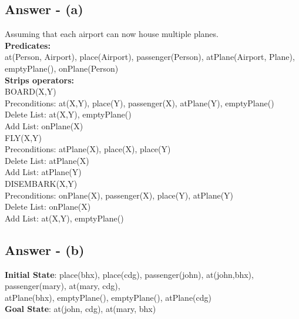 \documentclass{article}
\begin{document}
\subsection{Answer - (a)}
Assuming that each airport can now house multiple planes. \\
\newline
\textbf{Predicates: }\\
\newline
at(Person, Airport), place(Airport), passenger(Person),
atPlane(Airport, Plane), emptyPlane(), onPlane(Person) \\
\newline
\textbf{Strips operators: }\\
\newline
BOARD(X,Y) \\
\-\hspace{10mm} Preconditions: at(X,Y), place(Y), passenger(X), atPlane(Y), emptyPlane() \\
\-\hspace{10mm} Delete List: at(X,Y), emptyPlane() \\
\-\hspace{10mm} Add List: onPlane(X) \\
\newline
FLY(X,Y) \\
\-\hspace{10mm} Preconditions: atPlane(X), place(X), place(Y)\\
\-\hspace{10mm} Delete List: atPlane(X) \\
\-\hspace{10mm} Add List: atPlane(Y) \\
\newline
DISEMBARK(X,Y) \\
\-\hspace{10mm} Preconditions: onPlane(X), passenger(X), place(Y), atPlane(Y) \\
\-\hspace{10mm} Delete List: onPlane(X) \\
\-\hspace{10mm} Add List: at(X,Y), emptyPlane() \\
\newline
\subsection{Answer - (b)}
\textbf{Initial State}: place(bhx),
place(cdg), passenger(john), at(john,bhx), passenger(mary), at(mary, cdg), \\
atPlane(bhx), emptyPlane(), emptyPlane(), atPlane(cdg) \\
\newline 
\textbf{Goal State}: at(john, cdg), at(mary, bhx)
\end{document}
